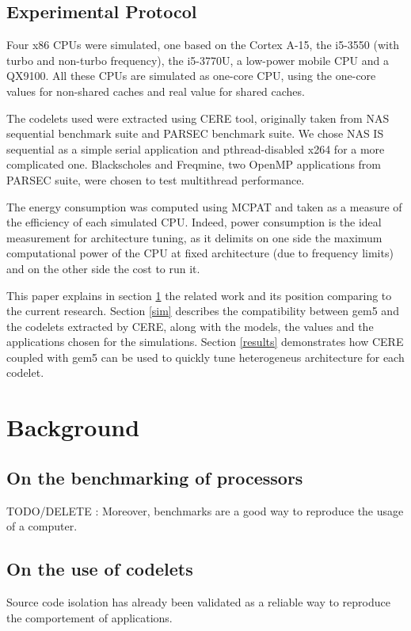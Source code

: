 \documentclass{article}
\begin{document}
\begin{multicols}{2}
\subsection{Experimental Protocol}
Four x86 CPUs were simulated, one based on the Cortex A-15\cite{DBLP:conf/samos/EndoCC14}, the i5-3550 (with turbo and non-turbo frequency), the i5-3770U, a low-power mobile CPU and a QX9100. All these CPUs are simulated as one-core CPU, using the one-core values for non-shared caches and real value for shared caches.

The codelets used were extracted using CERE\cite{CERE} tool, originally taken from NAS\cite{NAS} sequential benchmark suite and PARSEC\cite{PARSEC} benchmark suite. We chose NAS IS sequential as a simple serial application and pthread-disabled x264 for a more complicated one. Blackscholes and Freqmine, two OpenMP applications from PARSEC suite, were chosen to test multithread performance.


The energy consumption was computed using MCPAT\cite{MCPAT} and taken as a measure of the efficiency of each simulated CPU. Indeed, power consumption is the ideal measurement for architecture tuning, as it delimits on one side the maximum computational power of the CPU at fixed architecture (due to frequency limits) and on the other side the cost to run it.

This paper explains in section \ref{bckgrnd} the related work and its position comparing to the current research. Section \ref{sim} describes the compatibility between gem5 and the codelets extracted by CERE, along with the models, the values and the applications chosen for the simulations. Section \ref{results} demonstrates how CERE coupled with gem5 can be used to quickly tune heterogeneus architecture for each codelet.


\section{Background}
\label{bckgrnd}

\subsection{On the benchmarking of processors}
TODO/DELETE : Moreover, benchmarks are a good way to reproduce the usage of a computer\cite{select-bench}. %




\subsection{On the use of codelets}
Source code isolation has already been validated as a reliable way to reproduce the comportement of applications. 


\end{multicols}
\end{document}
